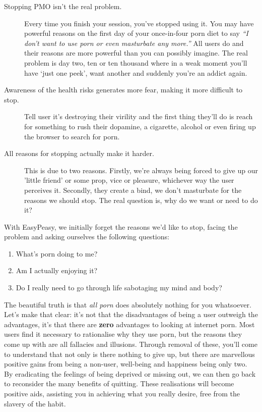 \documentclass[easypeasy.tex]{subfiles}
\begin{document}
\begin{description}
  \item [Stopping PMO isn't the real problem.] Every time you finish your session, you've stopped using it. You may have powerful reasons on the first day of your once-in-four porn diet to say \textit{``I don't want to use porn or even masturbate any more.''} All users do and their reasons are more powerful than you can possibly imagine. The real problem is day two, ten or ten thousand where in a weak moment you'll have `just one peek', want another and suddenly you're an addict again.

\item [Awareness of the health risks generates more fear, making it more difficult to stop.] Tell user it's destroying their virility and the first thing they'll do is reach for something to rush their dopamine, a cigarette, alcohol or even firing up the browser to search for porn.

\item [All reasons for stopping actually make it harder.] This is due to two reasons. Firstly, we're always being forced to give up our 'little friend' or some prop, vice or pleasure, whichever way the user perceives it. Secondly, they create a bind, we don't masturbate for the reasons we should stop. The real question is, why do we want or need to do it?
\end{description}

With EasyPeasy, we initially forget the reasons we'd like to stop, facing the problem and asking ourselves the following questions:

\begin{enumerate}
\item What's porn doing to me?
\item Am I actually enjoying it?
\item Do I really need to go through life sabotaging my mind and body?
\end{enumerate}

The beautiful truth is that \textit{all porn} does absolutely nothing for you whatsoever. Let's make that clear: it's not that the disadvantages of being a user outweigh the advantages, it's that there are \textbf{zero} advantages to looking at internet porn. Most users find it necessary to rationalise why they use porn, but the reasons they come up with are all fallacies and illusions. Through removal of these, you'll come to understand that not only is there nothing to give up, but there are marvellous positive gains from being a non-user, well-being and happiness being only two. By eradicating the feelings of being deprived or missing out, we can then go back to reconsider the many benefits of quitting. These realisations will become positive aids, assisting you in achieving what you really desire, free from the slavery of the habit.
\end{document}
